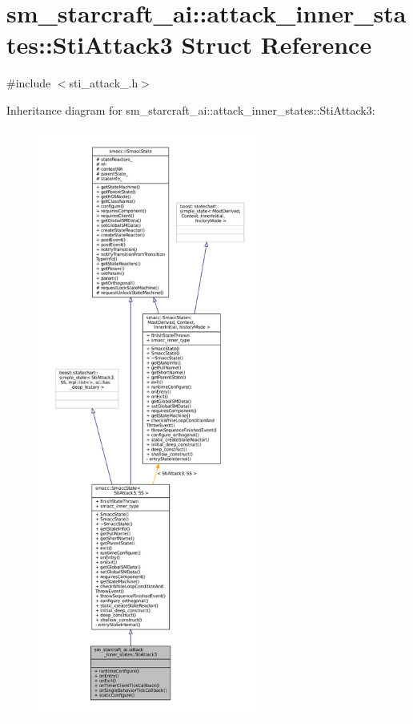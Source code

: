 \hypertarget{structsm__starcraft__ai_1_1attack__inner__states_1_1StiAttack3}{}\section{sm\+\_\+starcraft\+\_\+ai\+:\+:attack\+\_\+inner\+\_\+states\+:\+:Sti\+Attack3 Struct Reference}
\label{structsm__starcraft__ai_1_1attack__inner__states_1_1StiAttack3}


{\ttfamily \#include $<$sti\+\_\+attack\+\_.\+h$>$}



Inheritance diagram for sm\+\_\+starcraft\+\_\+ai\+:\+:attack\+\_\+inner\+\_\+states\+:\+:Sti\+Attack3\+:
\nopagebreak
\begin{figure}[H]
\begin{center}
\leavevmode
\includegraphics[height=550pt]{structsm__starcraft__ai_1_1attack__inner__states_1_1StiAttack3__inherit__graph}
\end{center}
\end{figure}



